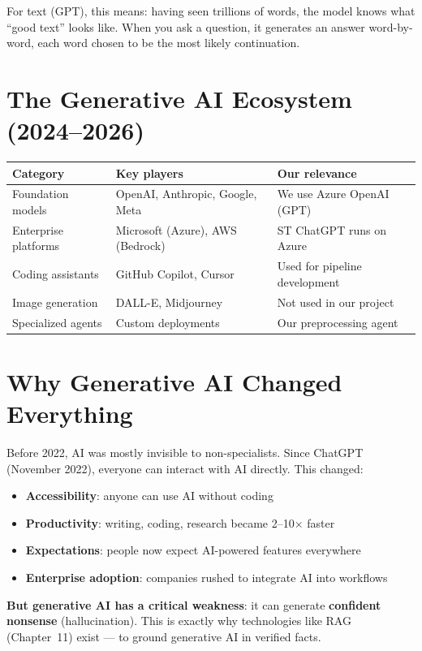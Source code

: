 \documentclass[11pt,a4paper]{report}
\begin{document}
For text (GPT), this means: having seen trillions of words, the model knows what ``good text'' looks like. When you ask a question, it generates an answer word-by-word, each word chosen to be the most likely continuation.

\section{The Generative AI Ecosystem (2024--2026)}

\begin{table}[h]
\centering
\begin{tabularx}{\textwidth}{l l X}
\toprule
\textbf{Category} & \textbf{Key players} & \textbf{Our relevance} \\
\midrule
Foundation models & OpenAI, Anthropic, Google, Meta & We use Azure OpenAI (GPT) \\
Enterprise platforms & Microsoft (Azure), AWS (Bedrock) & ST ChatGPT runs on Azure \\
Coding assistants & GitHub Copilot, Cursor & Used for pipeline development \\
Image generation & DALL-E, Midjourney & Not used in our project \\
Specialized agents & Custom deployments & Our preprocessing agent \\
\bottomrule
\end{tabularx}
\end{table}

\section{Why Generative AI Changed Everything}

Before 2022, AI was mostly invisible to non-specialists. Since ChatGPT (November 2022), everyone can interact with AI directly. This changed:

\begin{itemize}
    \item \textbf{Accessibility}: anyone can use AI without coding
    \item \textbf{Productivity}: writing, coding, research became 2--10$\times$ faster
    \item \textbf{Expectations}: people now expect AI-powered features everywhere
    \item \textbf{Enterprise adoption}: companies rushed to integrate AI into workflows
\end{itemize}

\textbf{But generative AI has a critical weakness}: it can generate \textbf{confident nonsense} (hallucination). This is exactly why technologies like RAG (Chapter~11) exist --- to ground generative AI in verified facts.
\end{document}
